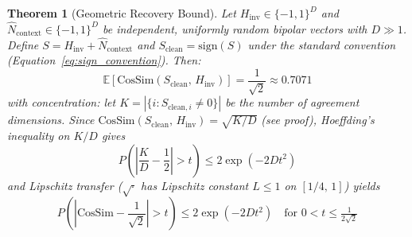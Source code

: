 \documentclass[a4paper,11pt]{article}
\newtheorem{theorem}{Theorem}
\begin{document}
\begin{theorem}[Geometric Recovery Bound]
\label{thm:geometric_bound}
Let $H_{\text{inv}} \in \{-1,1\}^D$ and $\hat{N}_{\text{context}} \in \{-1,1\}^D$ be independent, uniformly random bipolar vectors with $D \gg 1$. Define $S = H_{\text{inv}} + \hat{N}_{\text{context}}$ and $S_{\text{clean}} = \text{sign}(S)$ under the standard convention (Equation~\ref{eq:sign_convention}). Then:
\begin{equation}
    \mathbb{E}\!\left[\text{CosSim}(S_{\text{clean}},\, H_{\text{inv}})\right] = \frac{1}{\sqrt{2}} \approx 0.7071
    \label{eq:geometric_bound}
\end{equation}
with concentration: let $K = |\{i : S_{\text{clean},i} \neq 0\}|$ be the number of agreement dimensions. Since $\text{CosSim}(S_{\text{clean}},\, H_{\text{inv}}) = \sqrt{K/D}$ (see proof), Hoeffding's inequality on $K/D$ gives
\begin{equation}
    P\!\left(\left|\frac{K}{D} - \frac{1}{2}\right| > t\right) \leq 2\exp\!\left(-2Dt^2\right)
    \label{eq:concentration_K}
\end{equation}
and Lipschitz transfer ($\sqrt{\cdot}$ has Lipschitz constant $L \leq 1$ on $[1/4,\,1]$) yields
\begin{equation}
    P\!\left(\left|\text{CosSim} - \frac{1}{\sqrt{2}}\right| > t\right) \leq 2\exp\!\left(-2Dt^2\right) \quad \text{for } 0 < t \leq \tfrac{1}{2\sqrt{2}}
    \label{eq:concentration}
\end{equation}
\end{theorem}
\end{document}
